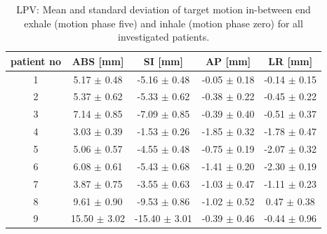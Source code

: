 \documentclass[type=dr, dr=rernat, accentcolor=tud7b,colorbacktitle, bigchapter, openright, twoside, 12pt ]{tudthesis}
\begin{document}
\begin{table}[htbp]
  \centering
  \caption{LPV: Mean and standard deviation of target motion in-between end exhale (motion phase five) and inhale (motion phase zero) for 
  all investigated patients.}
  \begin{tabular}{|c|c|c|c|c|}
    \hline\hline
    patient no\rule{0pt}{2.6ex}\rule[-1.2ex]{0pt}{0pt} & ABS [mm] & SI [mm] & AP [mm] & LR [mm]\\
    \hline
    1 & 5.17 $\pm$ 0.48 & -5.16 $\pm$ 0.48 & -0.05 $\pm$ 0.18 & -0.14 $\pm$ 0.15 \\
    2 & 5.37 $\pm$ 0.62 & -5.33 $\pm$ 0.62 & -0.38 $\pm$ 0.22 & -0.45 $\pm$ 0.22 \\
    3 & 7.14 $\pm$ 0.85 & -7.09 $\pm$ 0.85 & -0.39 $\pm$ 0.40 & -0.51 $\pm$ 0.37 \\
    4 & 3.03 $\pm$ 0.39 & -1.53 $\pm$ 0.26 & -1.85 $\pm$ 0.32 & -1.78 $\pm$ 0.47 \\
    5 & 5.06 $\pm$ 0.57 & -4.55 $\pm$ 0.48 & -0.75 $\pm$ 0.19 & -2.07 $\pm$ 0.32 \\
    6 & 6.08 $\pm$ 0.61 & -5.43 $\pm$ 0.68 & -1.41 $\pm$ 0.20 & -2.30 $\pm$ 0.19 \\
    7 & 3.87 $\pm$ 0.75 & -3.55 $\pm$ 0.63 & -1.03 $\pm$ 0.47 & -1.11 $\pm$ 0.23 \\
    8 & 9.61 $\pm$ 0.90 & -9.53 $\pm$ 0.86 & -1.02 $\pm$ 0.52 & 0.47 $\pm$ 0.38 \\
    9 & 15.50 $\pm$ 3.02 & -15.40 $\pm$ 3.01 & -0.39 $\pm$ 0.46 & -0.44 $\pm$ 0.96 \\
    \hline\hline
  \end{tabular}
  \label{tab:motion:LPV:mdacc}
\end{table}

\vspace*{-0.5cm}
\end{document}
